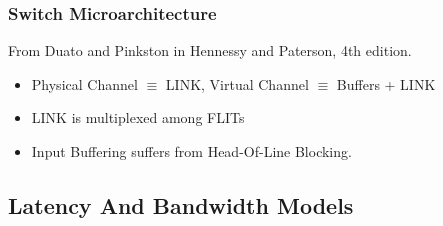 \documentclass{beamer}
\begin{document}
\begin{frame}[fragile,t]
\frametitle{Switch Microarchitecture}


{\scriptsize From Duato and Pinkston in Hennessy and Paterson, 4th edition.}
\pause

        \begin{itemize}
            \item Physical Channel $\equiv$ LINK, Virtual Channel $\equiv$ Buffers + LINK
            \item LINK is multiplexed among FLITs
            \item Input Buffering suffers from Head-Of-Line Blocking. 
        \end  {itemize}\smallskip


\end{frame}


\subsection{Latency And Bandwidth Models}
\begin{frame}[fragile]
	\tableofcontents[currentsubsection]
\end{frame}
\end{document}
